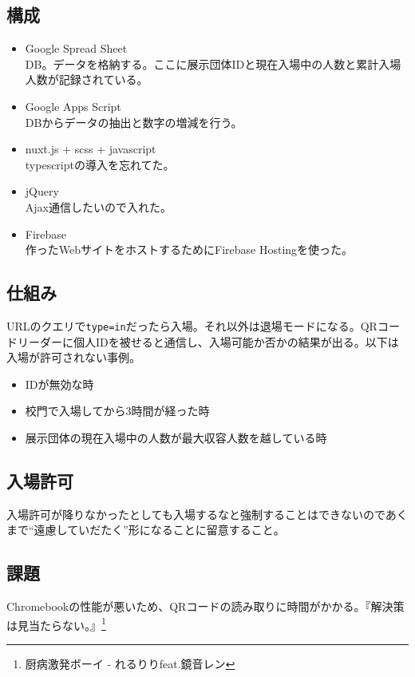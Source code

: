 \documentclass[dvipdfmx,jb5]{jreport}
\newcommand{\terlogy}[2][|]{\colorbox{terlogy}{\texttt{\lstinline#1#2#1}}}
\begin{document}
\subsection{構成}
\begin{itemize}
      \item Google Spread Sheet\\
            DB。データを格納する。ここに展示団体IDと現在入場中の人数と累計入場人数が記録されている。
      \item Google Apps Script\\
            DBからデータの抽出と数字の増減を行う。
      \item nuxt.js + scss + javascript\\
            typescriptの導入を忘れてた。
      \item jQuery\\
            Ajax通信したいので入れた。
      \item Firebase\\
            作ったWebサイトをホストするためにFirebase Hostingを使った。
\end{itemize}

\subsection{仕組み}
URLのクエリで\terlogy{type=in}だったら入場。それ以外は退場モードになる。QRコードリーダーに個人IDを被せると通信し、入場可能か否かの結果が出る。以下は入場が許可されない事例。
\begin{itemize}
      \item IDが無効な時
      \item 校門で入場してから3時間が経った時
      \item 展示団体の現在入場中の人数が最大収容人数を越している時
\end{itemize}

\subsection{入場許可}
入場許可が降りなかったとしても入場するなと強制することはできないのであくまで``遠慮していだたく''形になることに留意すること。

\subsection{課題}
Chromebookの性能が悪いため、QRコードの読み取りに時間がかかる。『解決策は見当たらない。』\footnote{厨病激発ボーイ - れるりりfeat.鏡音レン}
\end{document}
